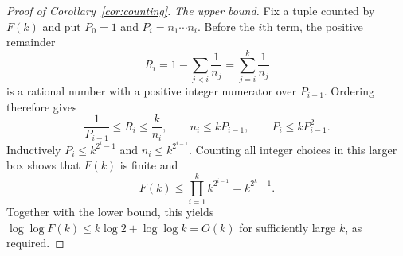 \begin{proof}[Proof of Corollary~\ref{cor:counting}]
\emph{The upper bound.}
Fix a tuple counted by $F(k)$ and put $P_0=1$ and
$P_i=n_1\cdots n_i$. Before the $i$th term, the positive remainder
\[
 R_i=1-\sum_{j<i}\frac1{n_j}=\sum_{j=i}^k\frac1{n_j}
\]
is a rational number with a positive integer numerator over
$P_{i-1}$. Ordering therefore gives
\[
 \frac1{P_{i-1}}\le R_i\le\frac{k}{n_i},
 \qquad n_i\le kP_{i-1},\qquad P_i\le kP_{i-1}^2.
\]
Inductively $P_i\le k^{2^i-1}$ and $n_i\le k^{2^{i-1}}$.
Counting all integer choices in this larger box shows that $F(k)$ is
finite and
\[
 F(k)\le\prod_{i=1}^k k^{2^{i-1}}=k^{2^k-1}.
\]
Together with the lower bound, this yields
$\log\log F(k)\le k\log2+\log\log k=O(k)$ for sufficiently
large $k$, as required.
\end{proof}
